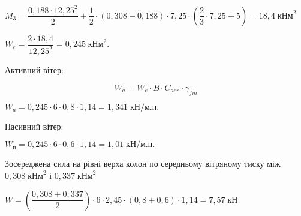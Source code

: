 \documentclass[a4paper,14pt]{article}
\begin{document}
$M_3 = \dfrac{0,188\cdot 12,25^2}{2}+\dfrac {1}{2}\cdot (0,308-0,188)\cdot 7,25 \cdot \left(\dfrac {2}{3}\cdot 7,25 + 5\right)= 18,4\;\textit{кНм}^2$ 

$W_\textit{e}= \dfrac{2\cdot 18,4}{12,25^2}= 0,245\;\textit{кНм}^2$. 

Активний вітер: 

\begin{equation}
    W_\textit{a}= W_\textit{e} \cdot B\cdot C_{aer}\cdot \gamma_{fm} 
\end{equation}

$W_\textit{a}= 0,245 \cdot 6\cdot 0,8\cdot 1,14 = 1,341\;\textit{кН/м.п.}$   

Пасивний вітер:

$W_\textit{п}= 0,245 \cdot 6\cdot 0,6\cdot 1,14 = 1,01\;\textit{кН/м.п.}$ 

Зосереджена сила на рівні верха колон по середньому вітряному тиску між $0,308\;\textit{кНм}^2$ і $0,337\;\textit{кНм}^2$

$W = \left(\dfrac{0,308+0,337}{2}\right)\cdot 6 \cdot 2,45 \cdot (0,8+0,6)\cdot 1,14 = 7,57\;\textit{кН}$ 
\end{document}
